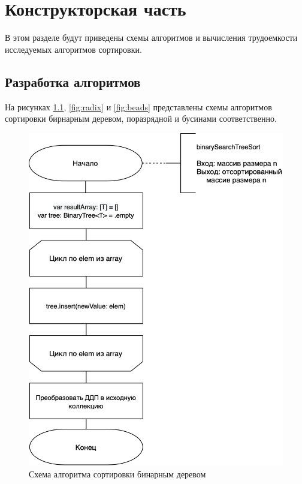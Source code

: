 \chapter{Конструкторская часть}
В этом разделе будут приведены схемы алгоритмов и вычисления трудоемкости
исследуемых алгоритмов сортировки.

\section{Разработка алгоритмов}

На рисунках  \ref{fig:bts}, \ref{fig:radix} и \ref{fig:beads}
представлены схемы алгоритмов сортировки бирнарным деревом, поразрядной и бусинами
соответственно.

\begin{figure}[h!]
    \centering
    \includegraphics[width=0.7\linewidth]{inc/img/bt_sort}
    \caption{Схема алгоритма сортировки бинарным деревом}
    \label{fig:bts}
\end{figure}

